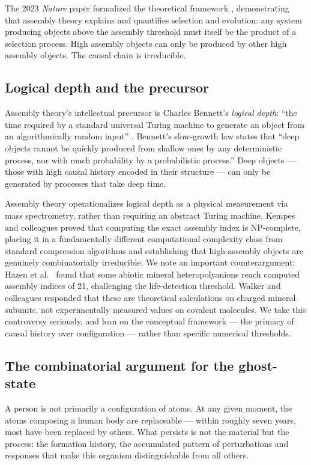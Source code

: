 \documentclass[12pt, a4paper]{article}
\begin{document}
The 2023 \textit{Nature} paper formalized the theoretical framework \citep{sharma2023},
demonstrating that assembly theory explains and quantifies selection and evolution: any system
producing objects above the assembly threshold must itself be the product of a selection
process. High assembly objects can only be produced by other high assembly objects. The
causal chain is irreducible.

\subsection{Logical depth and the precursor}

Assembly theory's intellectual precursor is Charles Bennett's \textit{logical depth}: ``the
time required by a standard universal Turing machine to generate an object from an
algorithmically random input'' \citep{bennett1988}. Bennett's slow-growth law states that
``deep objects cannot be quickly produced from shallow ones by any deterministic process, nor
with much probability by a probabilistic process.'' Deep objects --- those with high causal
history encoded in their structure --- can only be generated by processes that take deep
time.

Assembly theory operationalizes logical depth as a physical measurement via mass
spectrometry, rather than requiring an abstract Turing machine. Kempes and colleagues
\citep{kempes2025} proved that computing the exact assembly index is NP-complete, placing it
in a fundamentally different computational complexity class from standard compression
algorithms and establishing that high-assembly objects are genuinely combinatorially
irreducible. We note an important counterargument: Hazen et al.\ \citep{hazen2024} found
that some abiotic mineral heteropolyanions reach computed assembly indices of 21, challenging
the life-detection threshold. Walker and colleagues \citep{walkerthreshold2024} responded
that these are theoretical calculations on charged mineral subunits, not experimentally
measured values on covalent molecules. We take this controversy seriously, and lean on the
conceptual framework --- the primacy of causal history over configuration --- rather than
specific numerical thresholds.

\subsection{The combinatorial argument for the ghost-state}

A person is not primarily a configuration of atoms. At any given moment, the atoms composing
a human body are replaceable --- within roughly seven years, most have been replaced by
others. What persists is not the material but the process: the formation history, the
accumulated pattern of perturbations and responses that make this organism distinguishable
from all others.
\end{document}
